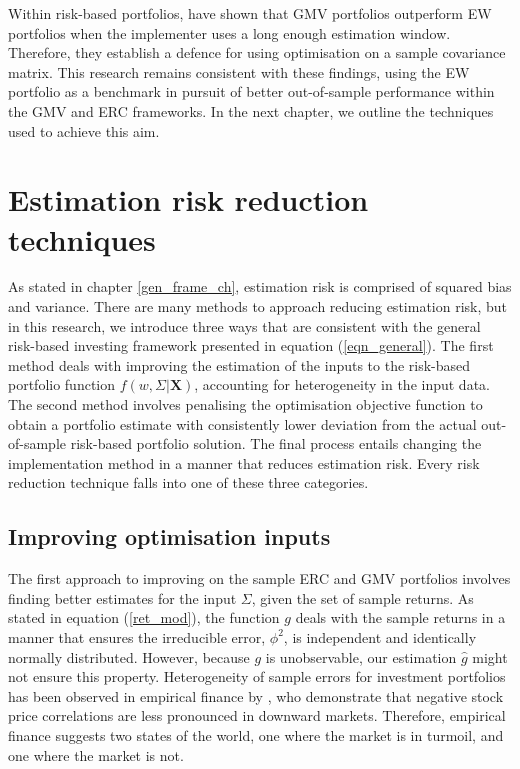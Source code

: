 \documentclass[a4paper,11pt,nocenter,bold,noupper,headcount]{mythesis}
\theoremstyle{plain}
\theoremstyle{definition}
\begin{document}
Within risk-based portfolios, \cite{K10} have shown that GMV portfolios outperform EW portfolios when the implementer uses a long enough estimation window. Therefore, they establish a defence for using optimisation on a sample covariance matrix. This research remains consistent with these findings, using the EW portfolio as a benchmark in pursuit of better out-of-sample performance within the GMV and ERC frameworks. In the next chapter, we outline the techniques used to achieve this aim.


\chapter{Estimation risk reduction techniques} \label{ge_reduce}

As stated in chapter \ref{gen_frame_ch}, estimation risk is comprised of squared bias and variance. There are many methods to approach reducing estimation risk, but in this research,  we introduce three ways that are consistent with the general risk-based investing framework presented in equation (\ref{eqn_general}). The first method deals with improving the estimation of the inputs to the risk-based portfolio function $f(w, \Sigma|\textbf{X})$, accounting for heterogeneity in the input data. The second method involves penalising the optimisation objective function to obtain a portfolio estimate with consistently lower deviation from the actual out-of-sample risk-based portfolio solution. The final process entails changing the implementation method in a manner that reduces estimation risk. Every risk reduction technique falls into one of these three categories.

\section{Improving optimisation inputs}

The first approach to improving on the sample ERC and GMV portfolios involves finding better estimates for the input $\Sigma$, given the set of sample returns. As stated in equation (\ref{ret_mod}), the function $g$ deals with the sample returns in a manner that ensures the irreducible error, $\phi^2$, is independent and identically normally distributed. However, because $g$ is unobservable, our estimation $\hat{g}$ might not ensure this property. Heterogeneity of sample errors for investment portfolios has been observed in empirical finance by \cite{AC02}, who demonstrate that negative stock price correlations are less pronounced in downward markets. Therefore, empirical finance suggests two states of the world, one where the market is in turmoil, and one where the market is not. 
\end{document}
